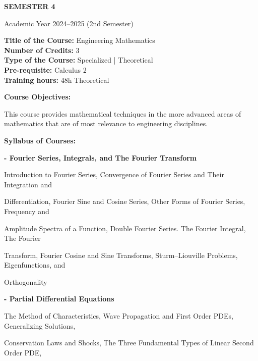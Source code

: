 \documentclass[12pt,a4paper]{article}
\begin{document}
\newpage
\vspace*{\fill}
\begin{center}
  {\fontsize{28pt}{34pt}\selectfont \textbf{SEMESTER 4}}\par\vspace{12pt}
  {\fontsize{13pt}{17pt}\selectfont Academic Year 2024–2025 (2nd Semester)}
\end{center}
\vspace*{\fill}

\newpage
\textbf{Title of the Course:} Engineering Mathematics\\
\textbf{Number of Credits:} 3\\
\textbf{Type of the Course:} Specialized | Theoretical\\
\textbf{Pre-requisite:} Calculus 2\\
\textbf{Training hours:} 48h Theoretical\par\vspace{4pt}
\textbf{Course Objectives:}\par\vspace{2pt}
This course provides mathematical techniques in the more advanced areas of mathematics that are
of most relevance to engineering disciplines.\par\vspace{4pt}
\textbf{Syllabus of Courses:}\par\vspace{2pt}
\vspace{2pt}\textbf{- Fourier Series, Integrals, and The Fourier Transform}\par
Introduction to Fourier Series, Convergence of Fourier Series and Their Integration and\par
Differentiation, Fourier Sine and Cosine Series, Other Forms of Fourier Series, Frequency and\par
Amplitude Spectra of a Function, Double Fourier Series. The Fourier Integral, The Fourier\par
Transform, Fourier Cosine and Sine Transforms, Sturm–Liouville Problems, Eigenfunctions, and\par
Orthogonality\par
\vspace{2pt}\textbf{- Partial Differential Equations}\par
The Method of Characteristics, Wave Propagation and First Order PDEs, Generalizing Solutions,\par
Conservation Laws and Shocks, The Three Fundamental Types of Linear Second Order PDE,\par
\end{document}
